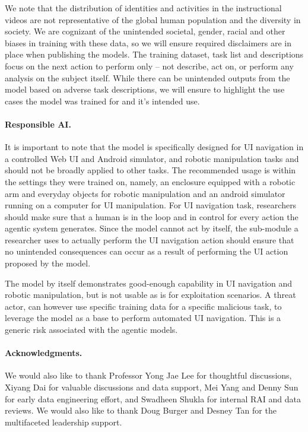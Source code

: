 We note that the distribution of identities and activities in the instructional videos are not representative of the global human population and the diversity in society. We are cognizant of the unintended societal, gender, racial and other biases in training with these data, so we will ensure required disclaimers are in place when publishing the models. The training dataset, task list and descriptions focus on the next action to perform only – not describe, act on, or perform any analysis on the subject itself. While there can be unintended outputs from the model based on adverse task descriptions, we will ensure to highlight the use cases the model was trained for and it’s intended use.  

\paragraph{\textbf{Responsible AI}.} It is important to note that the model is specifically designed for UI navigation in a controlled Web UI and Android simulator, and robotic manipulation tasks and should not be broadly applied to other tasks. The recommended usage is within the settings they were trained on, namely, an enclosure equipped with a robotic arm and everyday objects for robotic manipulation and an android simulator running on a computer for UI manipulation. For UI navigation task, researchers should make sure that a human is in the loop and in control for every action the agentic system generates. Since the model cannot act by itself, the sub-module a researcher uses to actually perform the UI navigation action should ensure that no unintended consequences can occur as a result of performing the UI action proposed by the model. 

The model by itself demonstrates good-enough capability in UI navigation and robotic manipulation, but is not usable as is for exploitation scenarios. A threat actor, can however use specific training data for a specific malicious task, to leverage the model as a base to perform automated UI navigation. This is a generic risk associated with the agentic models. 

\paragraph{Acknowledgments.} We would also like to thank Professor Yong Jae Lee for thoughtful discussions, Xiyang Dai for valuable discussions and data support, Mei Yang and Denny Sun for early data engineering effort, and Swadheen Shukla for internal RAI and data reviews. We would also like to thank Doug Burger and Desney Tan for the multifaceted leadership support.